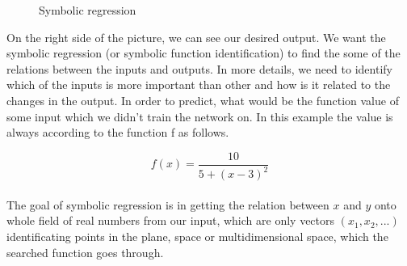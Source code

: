 \documentclass[a4paper,oneside,onecolumn,11pt]{report}
\begin{document}
	\begin{figure}
		\centering
		\caption{Symbolic regression}
		\label{regrese}
	\end{figure}

	On the right side of the picture, we can see our desired output.
	We want the symbolic regression (or symbolic function identification) to find the some of the
	relations between the inputs and outputs. In more details, we need to identify which of the inputs
	is more important than other and how is it related to the changes in the output. In order 
	to predict, what would be the function value of some input which we didn't train the network on.
	In this example the value is always according to the function f as follows.

	\begin{equation}
		f(x) = \frac{10}{5 + (x - 3)^2}
	\end{equation}\\

	The goal of symbolic regression is in getting the relation between $x$ and $y$ onto whole 
	field of real numbers from our input, which are only vectors $(x_1, x_2, ...)$ identificating points in 
	the plane, space or multidimensional space, which the searched function goes through.\\
\end{document}
